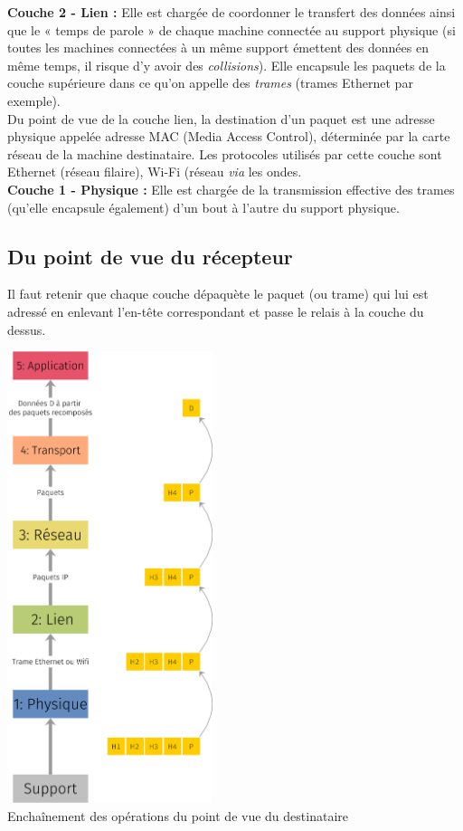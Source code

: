 \textbf{Couche 2 - Lien :} Elle est chargée de coordonner le transfert des données ainsi que le « temps de parole » de chaque machine connectée au support physique (si toutes les machines connectées à un même support émettent des données en même temps, il risque d'y avoir des \textit{collisions}). Elle encapsule les paquets de la couche supérieure dans ce qu'on appelle des \textit{trames} (trames Ethernet par exemple).\\
          Du point de vue de la couche lien, la destination d'un paquet est une adresse physique appelée adresse MAC (Media Access Control), déterminée par la carte réseau de la machine destinataire.
          Les protocoles utilisés par cette couche sont Ethernet (réseau filaire), Wi-Fi (réseau \textit{via} les ondes.\\
\textbf{Couche 1 - Physique :} Elle est chargée de la transmission effective des trames (qu'elle encapsule également) d'un bout à l'autre du support physique.


\subsection{Du point de vue du récepteur}

Il faut retenir que chaque couche dépaquète le paquet (ou trame) qui lui est adressé en enlevant l'en-tête correspondant et passe le relais à la couche du dessus.

\begin{center}
    \includegraphics[width=6cm]{ch-reseaux/img/modele_5_couches_down.png}\\
    \footnotesize{Enchaînement des opérations du point de vue du destinataire}
\end{center}
